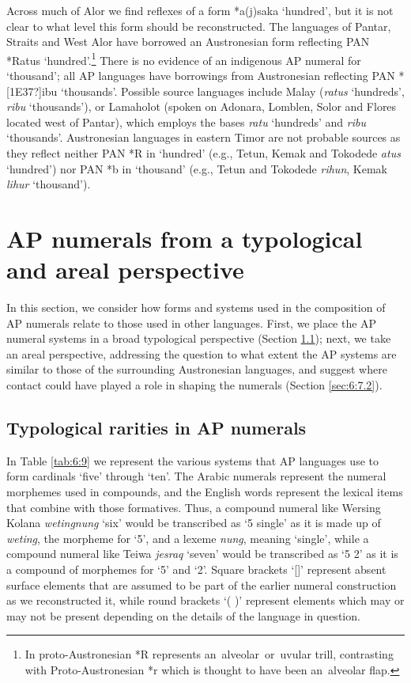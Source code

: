 \documentclass[output=paper]{LSP/langsci}
\begin{document}
Across much of Alor we find reflexes of a form *a(j)saka `hundred', but it is not clear to what level this form should be reconstructed. The languages of Pantar, Straits and West Alor have borrowed an Austronesian form reflecting PAN *Ratus `hundred'.\footnote{{}   In proto-Austronesian *R represents an{~}alveolar{~}or{~}uvular trill, contrasting with Proto-Austronesian *r which is thought to have been an{~}alveolar flap.} There is no evidence of an indigenous AP numeral for `thousand'; all AP languages have borrowings from Austronesian reflecting PAN *[1E37?]ibu `thousands'. Possible source languages include Malay (\textit{ratus} `hundreds', \textit{ribu} `thousands'), or Lamaholot (spoken on Adonara, Lomblen, Solor and Flores located west of Pantar), which employs the bases \textit{ratu} `hundreds' and \textit{ribu} `thousands'. Austronesian languages in eastern Timor are not probable sources as they reflect neither PAN *R in `hundred' (e.g., Tetun, Kemak and Tokodede \textit{atus} `hundred') nor PAN *b in `thousand' (e.g., Tetun and Tokodede \textit{rihun}, Kemak \textit{lihur} `thousand').

\section{AP numerals from a typological and areal perspective} \label{sec:6:7}
In this section, we consider how forms and systems used in the composition of AP numerals relate to those used in other languages. First, we place the AP numeral systems in a broad typological perspective (Section \ref{sec:6:7.1}); next, we take an areal perspective, addressing the question to what extent the AP systems are similar to those of the surrounding Austronesian languages, and suggest where contact could have played a role in shaping the numerals (Section \ref{sec:6:7.2}).

\subsection{Typological rarities in AP numerals}\label{sec:6:7.1} 
In Table \ref{tab:6:9} we represent the various systems that AP languages use to form cardinals `five' through `ten'. The Arabic numerals represent the numeral morphemes used in compounds, and the English words represent the lexical items that combine with those formatives. Thus, a compound numeral like Wersing Kolana \textit{wetingnung}  `six' would be transcribed as `5 single' as it is made up of \textit{weting}, the morpheme for `5', and a lexeme \textit{nung}, meaning `single', while a compound numeral like Teiwa \textit{jesraq} `seven' would be transcribed as `5 2' as it is a compound of morphemes for `5' and `2'.  Square brackets `[]' represent absent surface elements that are assumed to be part of the earlier numeral construction as we reconstructed it, while round brackets `( )' represent elements which may or may not be present depending on the details of the language in question.
 
\end{document}

